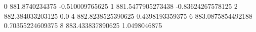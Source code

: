 0 881.8740234375 -0.510009765625
1 881.5477905273438 -0.83624267578125
2 882.384033203125 0.0
4 882.8238525390625 0.4398193359375
6 883.0875854492188 0.70355224609375
8 883.433837890625 1.0498046875
